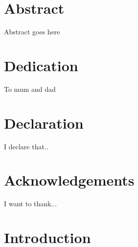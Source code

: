 


\begin{main}

\tableofcontents
\chapter*{Abstract}
Abstract goes here
\chapter*{Dedication}
To mum and dad

\chapter*{Declaration}
I declare that..

\chapter*{Acknowledgements}
I want to thank...
\chapter{Introduction}


\end{main}